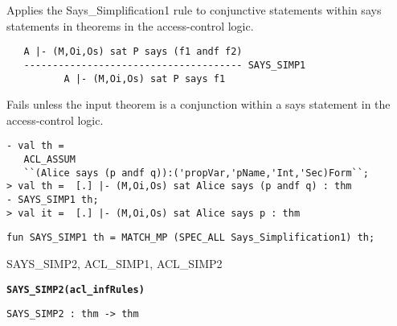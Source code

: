 \SYNOPSIS
Applies the Says_Simplification1 rule to conjunctive statements within
says statements in theorems in the access-control logic.

\DESCRIBE
\begin{verbatim}
   A |- (M,Oi,Os) sat P says (f1 andf f2)
   -------------------------------------- SAYS_SIMP1
          A |- (M,Oi,Os) sat P says f1
\end{verbatim}

\FAILURE
Fails unless the input theorem is a conjunction within a
says statement in the access-control logic.

\EXAMPLE
\begin{holboxed}
\begin{verbatim}
- val th = 
   ACL_ASSUM 
   ``(Alice says (p andf q)):('propVar,'pName,'Int,'Sec)Form``;
> val th =  [.] |- (M,Oi,Os) sat Alice says (p andf q) : thm
- SAYS_SIMP1 th;
> val it =  [.] |- (M,Oi,Os) sat Alice says p : thm
\end{verbatim}
\end{holboxed}

\IMPLEMENTATION
\begin{holboxed}
\begin{verbatim}
fun SAYS_SIMP1 th = MATCH_MP (SPEC_ALL Says_Simplification1) th;
\end{verbatim}
\end{holboxed}

\SEEALSO
SAYS\_SIMP2, ACL\_SIMP1, ACL\_SIMP2
\ENDDOC

\begin{holboxed}
  \begin{Large}
    \textbf{\texttt{SAYS_SIMP2}}\hfill{}\textbf{\texttt{(acl\_infRules)}}
  \end{Large}
\end{holboxed}

\begin{verbatim}
SAYS_SIMP2 : thm -> thm
\end{verbatim}

